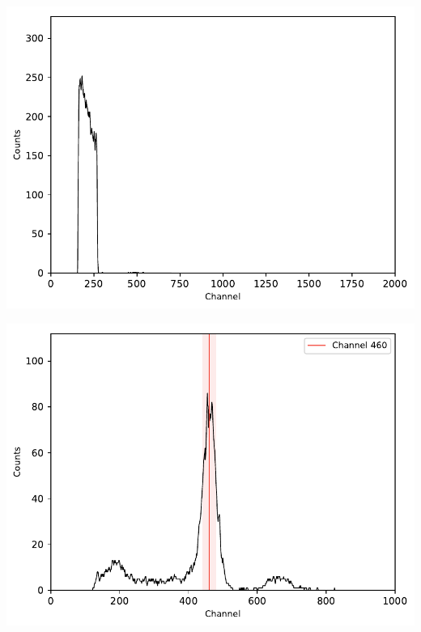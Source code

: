 \begin{multicols}{2}
\begin{center}
\begin{adjustbox}{max width=\linewidth, keepaspectratio}
        \end{adjustbox}
        \label{fig:137CsmitTPHC_gated}
    \end{center}
\endminipage
%
\vspace{10mm}
%
\minipage{\linewidth}
    \begin{center}
        \captionsetup{type=figure}
        \begin{adjustbox}{max width=\linewidth, keepaspectratio}
            \includegraphics[]{pdf/signal2eneriewindow}
        \end{adjustbox}
        \label{fig:signal2eneriewindow}
    \end{center}
\endminipage
%
\vspace{10mm}
%
\minipage{\linewidth}
    \begin{center}
        \captionsetup{type=figure}
        \begin{adjustbox}{max width=\linewidth, keepaspectratio}
            \includegraphics[]{pdf/comptonpeak}

\end{adjustbox}
\end{center}
\end{multicols}
